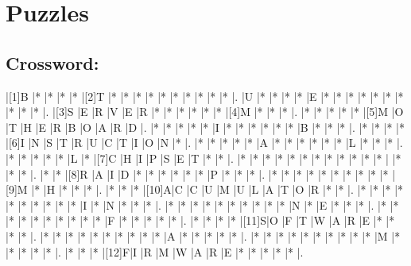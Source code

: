 \documentclass{article}
\begin{document}
\section*{Puzzles}

\subsection*{Crossword:}

\begin{Puzzle}{16}{19} %
|[1]B |*    |*    |*    |*    |[2]T |*    |*    |*    |*    |*    |*    |*    |*    |*    |*    |.
|U    |*    |*    |*    |*    |E    |*    |*    |*    |*    |*    |*    |*    |*    |*    |*    |.
|[3]S |E    |R    |V    |E    |R    |*    |*    |*    |*    |*    |*    |[4]M |*    |*    |*    |.
|*    |*    |*    |*    |*    |[5]M |O    |T    |H    |E    |R    |B    |O    |A    |R    |D    |.
|*    |*    |*    |*    |*    |I    |*    |*    |*    |*    |*    |*    |B    |*    |*    |*    |.
|*    |*    |*    |*    |[6]I |N    |S    |T    |R    |U    |C    |T    |I    |O    |N    |*    |.
|*    |*    |*    |*    |*    |A    |*    |*    |*    |*    |*    |*    |L    |*    |*    |*    |.
|*    |*    |*    |*    |*    |L    |*    |[7]C |H    |I    |P    |S    |E    |T    |*    |*    |.
|*    |*    |*    |*    |*    |*    |*    |*    |*    |*    |*    |*    |     |*    |*    |*    |.
|*    |*    |[8]R |A    |I    |D    |*    |*    |*    |*    |*    |*    |P    |*    |*    |*    |.
|*    |*    |*    |*    |*    |*    |*    |*    |*    |*    |[9]M |*    |H    |*    |*    |*    |.
|*    |*    |*    |[10]A|C    |C    |U    |M    |U    |L    |A    |T    |O    |R    |*    |*    |.
|*    |*    |*    |*    |*    |*    |*    |*    |*    |*    |I    |*    |N    |*    |*    |*    |.
|*    |*    |*    |*    |*    |*    |*    |*    |*    |*    |N    |*    |E    |*    |*    |*    |.
|*    |*    |*    |*    |*    |*    |*    |*    |*    |*    |F    |*    |*    |*    |*    |*    |.
|*    |*    |*    |*    |[11]S|O    |F    |T    |W    |A    |R    |E    |*    |*    |*    |*    |.
|*    |*    |*    |*    |*    |*    |*    |*    |*    |*    |A    |*    |*    |*    |*    |*    |.
|*    |*    |*    |*    |*    |*    |*    |*    |*    |*    |M    |*    |*    |*    |*    |*    |.
|*    |*    |*    |[12]F|I    |R    |M    |W    |A    |R    |E    |*    |*    |*    |*    |*    |.
\end{Puzzle}
\end{document}
